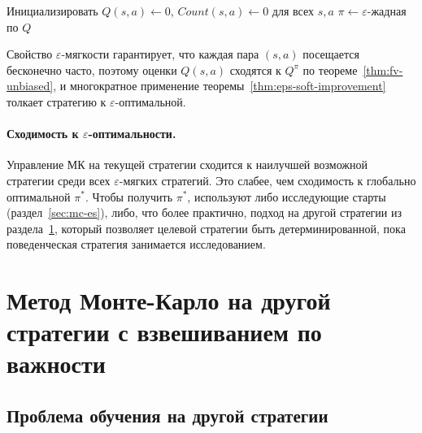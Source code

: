 \begin{algorithm}[ht]
\caption{Управление МК по первому посещению на текущей стратегии ($\varepsilon$-жадная)}
\label{alg:on-policy-mc}
Инициализировать $Q(s,a) \leftarrow 0$, $\mathit{Count}(s,a) \leftarrow 0$ для всех $s, a$\;
$\pi \leftarrow \varepsilon$-жадная по $Q$\;
\end{algorithm}

Свойство $\varepsilon$-мягкости гарантирует, что каждая пара $(s, a)$ посещается бесконечно часто, поэтому оценки $Q(s, a)$ сходятся к $Q^\pi$ по теореме~\ref{thm:fv-unbiased}, и многократное применение теоремы~\ref{thm:eps-soft-improvement} толкает стратегию к $\varepsilon$-оптимальной.

\paragraph{Сходимость к $\varepsilon$-оптимальности.}  Управление МК на текущей стратегии сходится к наилучшей возможной стратегии среди всех $\varepsilon$-мягких стратегий.  Это слабее, чем сходимость к глобально оптимальной $\pi^*$.  Чтобы получить $\pi^*$, используют либо исследующие старты (раздел~\ref{sec:mc-es}), либо, что более практично, подход на другой стратегии из раздела~\ref{sec:mc-importance-sampling}, который позволяет целевой стратегии быть детерминированной, пока поведенческая стратегия занимается исследованием.


\section{Метод Монте-Карло на другой стратегии с взвешиванием по важности}
\label{sec:mc-importance-sampling}

\subsection*{Проблема обучения на другой стратегии}

